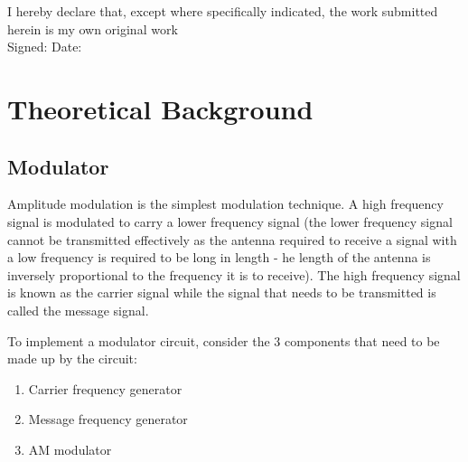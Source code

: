 \documentclass[12pt, a4paper]{article}
\begin{document}
	\begin{titlepage}
		\vspace*{1.5cm}
		\vspace*{1.5cm}
		\vspace*{1.5cm}
		\vspace*{0.5cm}
		\vspace*{0.1cm}
		\vspace*{0.1cm}
		\vspace*{0.1cm}
		\vspace*{0.3cm}
		\makebox[\textwidth]{\today}
		\vfill
		\noindent I hereby declare that, except where specifically indicated, the work submitted herein is my own original work\\
		Signed: \hspace*{5cm} Date:
	\end{titlepage}

	\tableofcontents
	\newpage

\section{Theoretical Background}
\label{sec:theoretical_background}
	\subsection{Modulator}
		Amplitude modulation is the simplest modulation technique. A high frequency signal is modulated to carry a lower frequency signal (the lower frequency signal cannot be transmitted effectively as the antenna required to receive a signal with a low frequency is required to be long in length - he length of the antenna is inversely proportional to the frequency it is to receive). The high frequency signal is known as the carrier signal while the signal that needs to be transmitted is called the message signal.

		To implement a modulator circuit, consider the 3 components that need to be made up by the circuit:
		\begin{enumerate}
			\item Carrier frequency generator
			\item Message frequency generator
			\item AM modulator
		\end{enumerate}
\end{document}
